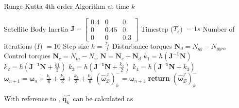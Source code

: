 \begin{algorithm}[!htb]
\caption[Runge-Kutta]{Runge-Kutta 4th order Algorithm at time $k$}
\label{alg: Runge-Kutta}
\begin{algorithmic}[1]
	\State Satellite Body Inertia $\mathbf{J} = \begin{bmatrix}
	0.4 & 0 & 0\\
	0 & 0.45 & 0 \\
	0 & 0 & 0.3
	\end{bmatrix}$
	\State Timestep ($T_s$) $= 1s$
	\State Number of iterations ($I$) $= 10$
	\State Step size $h = \frac{T_s}{I}$
	\State Disturbance torques $\mathbf{N}_d = N_{gg} - N_{gyro} $ %
	\State Control torques $\mathbf{N}_c = N_m - N_w$
	\State $\mathbf{N} = \mathbf{N}_c + \mathbf{N}_d$
	\State \texttt{$k_1 = h(\mathbf{J^{-1}}\mathbf{N})$}
	\State \texttt{$k_2 = h(\mathbf{J^{-1}}\mathbf{N} + \frac{k1}{2})$}
	\State \texttt{$k_3 = h(\mathbf{J^{-1}}\mathbf{N} + \frac{k_2}{2})$}
	\State \texttt{$k_4 = h(\mathbf{J^{-1}}\mathbf{N} + k_3)$}
	\State \texttt{$\boldsymbol{\omega}_{n+1}=\boldsymbol{\omega}_n + \frac{k_1}{6} + \frac{k_2}{3} + \frac{k_3}{3} + \frac{k_4}{6}$}
	\EndFor
	\State $(\boldsymbol{\hat{\omega}}_{\mathcal{B}}^{\mathcal{I}})_k^- = \boldsymbol{\omega}_{n+1}$
	\State \textbf{return} $(\boldsymbol{\hat{\omega}}_{\mathcal{B}}^{\mathcal{I}})_k^-$
\end{algorithmic}
\end{algorithm}
With reference to \cite{JansevanVuuren2015}, $\hat{\mathbf{q}}_k^-$ can be calculated as

